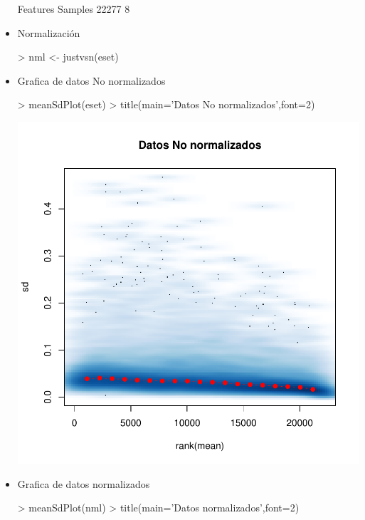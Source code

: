 \documentclass[12pt]{article}
\begin{document}
\begin{itemize}
\begin{Schunk}
\begin{Soutput}
Features  Samples 
   22277        8 
\end{Soutput}
\end{Schunk}
\item{Normalización}
\begin{Schunk}
\begin{Sinput}
> nml <- justvsn(eset)
\end{Sinput}
\end{Schunk}
\item{Grafica de datos No normalizados}
\begin{Schunk}
\begin{Sinput}
> meanSdPlot(eset)
> title(main='Datos No normalizados',font=2)
\end{Sinput}
\end{Schunk}
\includegraphics{JuanHenao_Taller3-004}
\item{Grafica de datos normalizados}
\begin{Schunk}
\begin{Sinput}
> meanSdPlot(nml)
> title(main='Datos normalizados',font=2)
\end{Sinput}
\end{Schunk}

\end{itemize}
\end{document}
